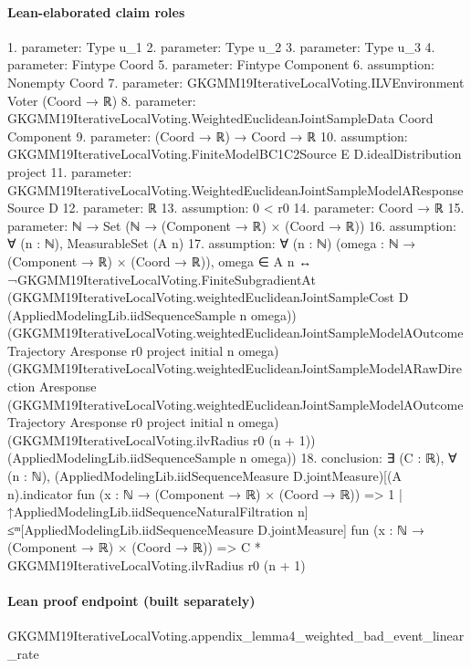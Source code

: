 \documentclass[10pt]{article}
\begin{document}
\paragraph{Lean-elaborated claim roles}\begin{ReviewVerbatim}
1. parameter: Type u_1
2. parameter: Type u_2
3. parameter: Type u_3
4. parameter: Fintype Coord
5. parameter: Fintype Component
6. assumption: Nonempty Coord
7. parameter: GKGMM19IterativeLocalVoting.ILVEnvironment Voter (Coord → ℝ)
8. parameter: GKGMM19IterativeLocalVoting.WeightedEuclideanJointSampleData Coord Component
9. parameter: (Coord → ℝ) → Coord → ℝ
10. assumption: GKGMM19IterativeLocalVoting.FiniteModelBC1C2Source E D.idealDistribution project
11. parameter: GKGMM19IterativeLocalVoting.WeightedEuclideanJointSampleModelAResponseSource D
12. parameter: ℝ
13. assumption: 0 < r0
14. parameter: Coord → ℝ
15. parameter: ℕ → Set (ℕ → (Component → ℝ) × (Coord → ℝ))
16. assumption: ∀ (n : ℕ), MeasurableSet (A n)
17. assumption: ∀ (n : ℕ) (omega : ℕ → (Component → ℝ) × (Coord → ℝ)),
  omega ∈ A n ↔
    ¬GKGMM19IterativeLocalVoting.FiniteSubgradientAt
        (GKGMM19IterativeLocalVoting.weightedEuclideanJointSampleCost D (AppliedModelingLib.iidSequenceSample n omega))
        (GKGMM19IterativeLocalVoting.weightedEuclideanJointSampleModelAOutcomeTrajectory Aresponse r0 project initial n
          omega)
        (GKGMM19IterativeLocalVoting.weightedEuclideanJointSampleModelARawDirection Aresponse
          (GKGMM19IterativeLocalVoting.weightedEuclideanJointSampleModelAOutcomeTrajectory Aresponse r0 project initial
            n omega)
          (GKGMM19IterativeLocalVoting.ilvRadius r0 (n + 1)) (AppliedModelingLib.iidSequenceSample n omega))
18. conclusion: ∃ (C : ℝ),
  ∀ (n : ℕ),
    (AppliedModelingLib.iidSequenceMeasure
          D.jointMeasure)[(A n).indicator fun (x : ℕ → (Component → ℝ) × (Coord → ℝ)) => 1 |
        ↑AppliedModelingLib.iidSequenceNaturalFiltration n] ≤ᵐ[AppliedModelingLib.iidSequenceMeasure D.jointMeasure]
      fun (x : ℕ → (Component → ℝ) × (Coord → ℝ)) => C * GKGMM19IterativeLocalVoting.ilvRadius r0 (n + 1)
\end{ReviewVerbatim}

\paragraph{Lean proof endpoint (built separately)}\begin{ReviewVerbatim}
GKGMM19IterativeLocalVoting.appendix_lemma4_weighted_bad_event_linear_rate
\end{ReviewVerbatim}
\end{document}
